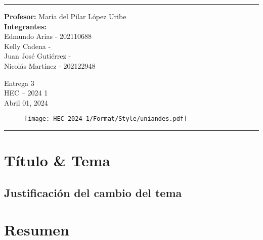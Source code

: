 \documentclass[a4paper]{article}
\begin{document}

\fancyhead[C]{}
\hrule \medskip 
\begin{minipage}{0.295\textwidth} 
\raggedright
\textbf{Profesor:} María del Pilar López Uribe\\
\vspace{2mm}
\textbf{Integrantes:} \\
Edmundo Arias - 202110688\\
Kelly Cadena - \\
Juan José Gutiérrez - \\
Nicolás Martínez - 202122948\\



\end{minipage}
\begin{minipage}{0.4\textwidth} 
\centering 
\huge 
Entrega 3\\ 
\vspace{2mm}
\normalsize 
HEC – 2024 1\\ 
Abril 01, 2024
\end{minipage}
\begin{minipage}{0.295\textwidth} 
\begin{figure}[H]
\raggedleft
\texttt{[image: HEC 2024-1/Format/Style/uniandes.pdf]}
\end{figure}
\hfill
\end{minipage}
\medskip\hrule 
\bigskip

\section{Título \& Tema}

\subsection{Justificación del cambio del tema}

\section{Resumen}
\end{document}
